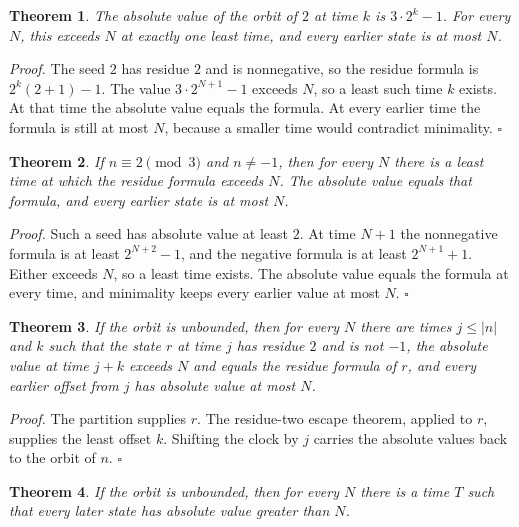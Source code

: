 \documentclass[11pt,letterpaper]{article}
\newtheorem{theorem}{Theorem}
\newenvironment{proof}{\noindent\textit{Proof.}}{\hfill\(\square\)}
\begin{document}
\begin{theorem}
\label{thm:twoescape}
The absolute value of the orbit of \(2\) at time \(k\) is \(3\cdot 2^{k}-1\). For every \(N\), this exceeds \(N\) at exactly one least time, and every earlier state is at most \(N\).
\end{theorem}

\begin{proof}
The seed \(2\) has residue \(2\) and is nonnegative, so the residue formula is \(2^{k}(2+1)-1\). The value \(3\cdot 2^{N+1}-1\) exceeds \(N\), so a least such time \(k\) exists. At that time the absolute value equals the formula. At every earlier time the formula is still at most \(N\), because a smaller time would contradict minimality.
\end{proof}

\begin{theorem}
\label{thm:residueescape}
If \(n\equiv 2\pmod{3}\) and \(n\ne -1\), then for every \(N\) there is a least time at which the residue formula exceeds \(N\). The absolute value equals that formula, and every earlier state is at most \(N\).
\end{theorem}

\begin{proof}
Such a seed has absolute value at least \(2\). At time \(N+1\) the nonnegative formula is at least \(2^{N+2}-1\), and the negative formula is at least \(2^{N+1}+1\). Either exceeds \(N\), so a least time exists. The absolute value equals the formula at every time, and minimality keeps every earlier value at most \(N\).
\end{proof}

\begin{theorem}
\label{thm:unboundedescape}
If the orbit is unbounded, then for every \(N\) there are times \(j\le |n|\) and \(k\) such that the state \(r\) at time \(j\) has residue \(2\) and is not \(-1\), the absolute value at time \(j+k\) exceeds \(N\) and equals the residue formula of \(r\), and every earlier offset from \(j\) has absolute value at most \(N\).
\end{theorem}

\begin{proof}
The partition supplies \(r\). The residue-two escape theorem, applied to \(r\), supplies the least offset \(k\). Shifting the clock by \(j\) carries the absolute values back to the orbit of \(n\).
\end{proof}

\begin{theorem}
\label{thm:eventually}
If the orbit is unbounded, then for every \(N\) there is a time \(T\) such that every later state has absolute value greater than \(N\).
\end{theorem}
\end{document}
